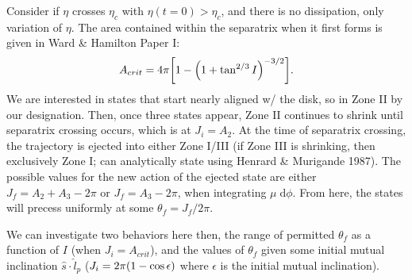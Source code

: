 \documentclass[11pt,
        usenames, %
        dvipsnames %
    ]{article}
\DeclarePairedDelimiter\p{\lparen}{\rparen}
\DeclarePairedDelimiter\s{\lbrack}{\rbrack}
\begin{document}
Consider if $\eta$ crosses $\eta_c$ with $\eta(t = 0) > \eta_c$, and there is no
dissipation, only variation of $\eta$. The area contained within the separatrix
when it first forms is given in Ward \& Hamilton Paper I\@:
\begin{equation}
    A_{crit} = 4\pi \s*{1 - \p*{1 + \tan^{2/3}I}^{-3/2}}.
\end{equation}
We are interested in states that start nearly aligned w/ the disk, so in Zone II
by our designation. Then, once three states appear, Zone II continues to shrink
until separatrix crossing occurs, which is at $J_i = A_2$. At the time of
separatrix crossing, the trajectory is ejected into either Zone I/III (if Zone
III is shrinking, then exclusively Zone I\@; can analytically state using
Henrard \& Murigande 1987). The possible values for the new action of the
ejected state are either $J_f = A_2 + A_3 - 2\pi$ or $J_f = A_3 - 2\pi$, when
integrating $\mu\;\mathrm{d}\phi$. From here, the states will precess uniformly
at some $\theta_f = J_f / 2\pi$.

We can investigate two behaviors here then, the range of permitted $\theta_f$ as
a function of $I$ (when $J_i = A_{crit}$), and the values of $\theta_f$ given
some initial mutual inclination $\hat{s} \cdot \hat{l}_p$ ($J_i = 2\pi\p*{1 -
\cos \epsilon}$ where $\epsilon$ is the initial mutual inclination).
\end{document}
